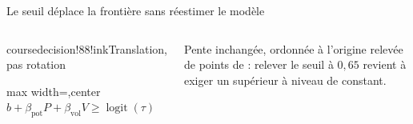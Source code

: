 \begin{frame}[t]{Le seuil déplace la frontière sans réestimer le modèle}
  \begin{columns}[c,onlytextwidth]
      \begin{coursecallout}{coursedecision!88!ink}{Translation, pas rotation}
        \begin{adjustbox}{max width=\linewidth,center}
          $b+\beta_{\mathrm{pot}}P+\beta_{\mathrm{vol}}V
            \geq\operatorname{logit}(\tau)$
        \end{adjustbox}
      \end{coursecallout}
      \par\smallskip
      {\small Pente inchangée, ordonnée à l'origine relevée de
      \MicroBoundaryShift{} points de \VolName{} : relever le seuil à
      \(0{,}65\) revient à exiger un \VolName{} supérieur à niveau de
      \PotionsName{} constant.}
  \end{columns}
\end{frame}


